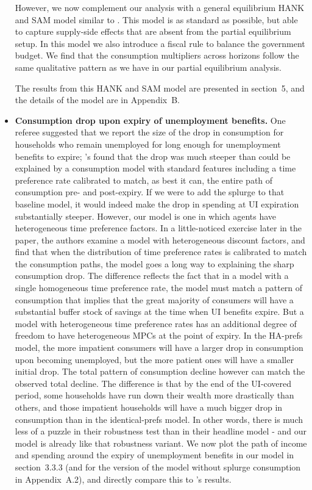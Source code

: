 \begin{itemize}
	However, we now complement our analysis with a general equilibrium HANK and SAM model similar to \citet{Ravn2017}. This model is as standard as possible, but able to capture supply-side effects that are absent from the partial equilibrium setup. In this model we also introduce a fiscal rule to balance the government budget. We find that the consumption multipliers across horizons follow the same qualitative pattern as we have in our partial equilibrium analysis.
	
	The results from this HANK and SAM model are presented in section~5, and the details of the model are in Appendix~B.
	
      \item \textbf{Consumption drop upon expiry of unemployment benefits.} One referee suggested that we report the size of the drop in consumption for households who remain unemployed for long enough for unemployment benefits to expire; \citeauthor{ganongConsumer2019}'s found that the drop was much steeper than could be explained by a consumption model with standard features including a time preference rate calibrated to match, as best it can, the entire path of consumption pre- and post-expiry.  If we were to add the splurge to that baseline model, it would indeed make the drop in spending at UI expiration substantially steeper. However, our model is one in which agents have heterogeneous time preference factors.  In a little-noticed exercise later in the \citeauthor{ganongConsumer2019} paper, the authors examine a model with heterogeneous discount factors, and find that when the distribution of time preference rates is calibrated to match the consumption paths, the model goes a long way to explaining the sharp consumption drop.  The difference reflects the fact that in a model with a single homogeneous time preference rate, the model must match a pattern of consumption that implies that the great majority of consumers will have a substantial buffer stock of savings at the time when UI benefits expire.  But a model with heterogeneous time preference rates has an additional degree of freedom to have heterogeneous MPCs at the point of expiry.  In the HA-prefs model, the more impatient consumers will have a larger drop in consumption upon becoming unemployed, but the more patient ones will have a smaller initial drop. The total pattern of consumption decline however can match the observed total decline.  The difference is that by the end of the UI-covered period, some households have run down their wealth more drastically than others, and those impatient households will have a much bigger drop in consumption than in the identical-prefs model.  In other words, there is much less of a puzzle in their robustness test than in their headline model - and our model is already like that robustness variant.
        We now plot the path of income and spending around the expiry of unemployment benefits in our model in section~3.3.3 (and for the version of the model without splurge consumption in Appendix~A.2), and directly compare this to \citeauthor{ganongConsumer2019}'s results.
	
	
\end{itemize}
